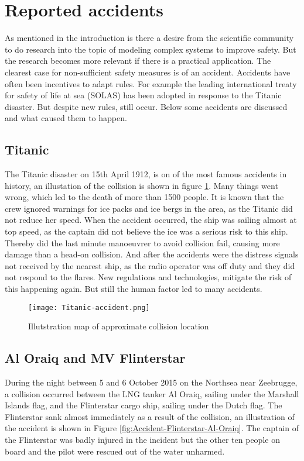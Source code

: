 \section{Reported accidents}
\label{sec:accidents}
As mentioned in the introduction is there a desire from the scientific community to do research into the topic of modeling complex systems to improve safety. But the research becomes more relevant if there is a practical application. The clearest case for non-sufficient safety measures is of an accident. Accidents have often been incentives to adapt rules. For example the leading international treaty for safety of life at sea (\ac{SOLAS}) has been adopted in response to the Titanic disaster. But despite new rules, still occur. Below some accidents are discussed and what caused them to happen.

\subsection{Titanic}
The Titanic disaster on 15th April 1912, is on of the most famous accidents in history, an illustation of the collision is shown in figure \ref{fig:Accident-Titanic}. Many things went wrong, which led to the death of more than 1500 people. It is known that the crew ignored warnings for ice packs and ice bergs in the area, as the Titanic did not reduce her speed. When the accident occurred, the ship was sailing almost at top speed, as the captain did not believe the ice was a serious risk to this ship. Thereby did the last minute manoeuvrer to avoid collision fail, causing more damage than a head-on collision. And after the accidents were the distress signals not received by the nearest ship, as the radio operator was off duty and they did not respond to the flares. New regulations and technologies, mitigate the risk of this happening again. But still the human factor led to many accidents.

\begin{figure}[H]
	\centering
	\texttt{[image: Titanic-accident.png]}
	\caption{Illutstration map of approximate collision location}
	\label{fig:Accident-Titanic}
\end{figure}

\newpage
\subsection{Al Oraiq and MV Flinterstar}
During the night between 5 and 6 October 2015 on the Northsea near Zeebrugge, a collision occurred between the LNG tanker Al Oraiq, sailing under the Marshall Islands flag, and the Flinterstar cargo ship, sailing under the Dutch flag. The Flinterstar sank almost immediately as a result of the collision, an illustration of the accident is shown in Figure \ref{fig:Accident-Flinterstar-Al-Oraiq}. The captain of the Flinterstar was badly injured in the incident but the other ten people on board and the pilot were rescued out of the water unharmed.

